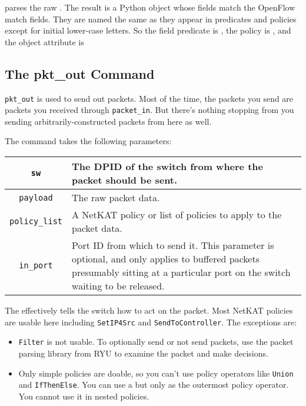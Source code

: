  parses the raw 
.  The result is a Python object whose fields match the OpenFlow
match fields.  They are named the same as they appear in  predicates and
 policies except for initial lower-case letters.  So the 
field predicate is , the policy is , and the object
attribute is  

\subsection{The pkt\_out Command}

\texttt{pkt\_out} is used to send out packets.  
Most of the time, the packets you send are packets you received through \texttt{packet\_in}.
But there's nothing stopping from you sending arbitrarily-constructed packets from here as well.  

The command takes the following parameters:

\bigskip
\begin{tabularx}{\linewidth}{|c|X|}
\hline\hline
\texttt{sw} & The DPID of the switch from where the packet should be sent.
\\ \hline
\texttt{payload} & The raw packet data.
\\ \hline
\texttt{policy\_list} & A NetKAT policy or list of policies to apply to the packet data.
\\ \hline
\texttt{in\_port} & Port ID from which to send it.
This parameter is optional, and only applies to buffered packets presumably sitting at a particular port on
the switch waiting to be released.
\\ \hline\hline
\end{tabularx}

\bigskip

The  effectively tells the switch how to act on the packet.  
Most NetKAT policies are usable here including \texttt{SetIP4Src} and \texttt{SendToController}.  The
exceptions are:

\begin{itemize}
  \item \texttt{Filter} is not usable.  To optionally send or not send packets, use the packet parsing library
  from RYU to examine the packet and make decisions.  
  \item Only simple policies are doable, so you can't use policy operators like \texttt{Union} 
  and \texttt{IfThenElse}.  You can use a  but only as the outermost policy operator.  You cannot
  use it in nested policies.  
\end{itemize}

